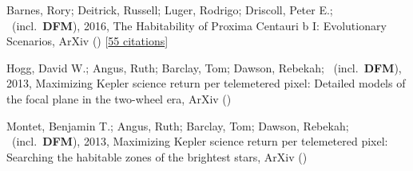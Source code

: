 \item[{\color{numcolor}\scriptsize3}] Barnes, Rory; Deitrick, Russell; Luger, Rodrigo; Driscoll, Peter E.; \etal\ (incl.\ \textbf{DFM}), 2016, The Habitability of Proxima Centauri b I: Evolutionary Scenarios, ArXiv () [\href{https://ui.adsabs.harvard.edu/abs/2016arXiv160806919B}{55 citations}]

\item[{\color{numcolor}\scriptsize2}] Hogg, David W.; Angus, Ruth; Barclay, Tom; Dawson, Rebekah; \etal\ (incl.\ \textbf{DFM}), 2013, Maximizing Kepler science return per telemetered pixel: Detailed models of the focal plane in the two-wheel era, ArXiv ()

\item[{\color{numcolor}\scriptsize1}] Montet, Benjamin T.; Angus, Ruth; Barclay, Tom; Dawson, Rebekah; \etal\ (incl.\ \textbf{DFM}), 2013, Maximizing Kepler science return per telemetered pixel: Searching the habitable zones of the brightest stars, ArXiv ()
